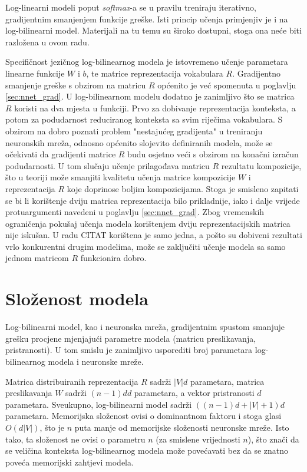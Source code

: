 \documentclass[times, utf8, diplomski, numeric]{fer}
\begin{document}
Log-linearni modeli poput \textit{softmax}-a se u pravilu treniraju iterativno, gradijentnim smanjenjem funkcije greške. Isti princip učenja primjenjiv je i na log-bilinearni model. Materijali na tu temu su široko dostupni, stoga ona neće biti razložena u ovom radu.

Specifičnost jezičnog log-bilinearnog modela je istovremeno učenje parametara linearne funkcije $W$ i $b$, te matrice reprezentacija vokabulara $R$. Gradijentno smanjenje greške s obzirom na matricu $R$ općenito je već spomenuta u poglavlju \ref{sec:nnet_grad}. U log-bilinearnom modelu dodatno je zanimljivo što se matrica $R$ koristi na dva mjesta u funkciji. Prvo za dobivanje reprezentacija konteksta, a potom za podudarnost reduciranog konteksta sa svim riječima vokabulara. S obzirom na dobro poznati problem "nestajućeg gradijenta" u treniranju neuronskih mreža, odnosno općenito slojevito definiranih modela, može se očekivati da gradijenti matrice $R$ budu osjetno veći s obzirom na konačni izračun podudarnosti. U tom slučaju učenje prilagođava matricu $R$ rezultatu kompozicije, što u teoriji može smanjiti kvalitetu učenja matrice kompozicije $W$ i reprezentacija $R$ koje doprinose boljim kompozicijama. Stoga je smisleno zapitati se bi li korištenje dviju matrica reprezentacija bilo prikladnije, iako i dalje vrijede protuargumenti navedeni u poglavlju \ref{sec:nnet_grad}. Zbog vremenskih ograničenja pokušaj učenja modela korištenjem dviju reprezentacijskih matrica nije iskušan. U radu CITAT korištena je samo jedna, a pošto su dobiveni rezultati  vrlo konkurentni drugim modelima, može se zaključiti učenje modela sa samo jednom matricom $R$ funkcionira dobro.

\section{Složenost modela}

Log-bilinearni model, kao i neuronska mreža, gradijentnim spustom smanjuje grešku procjene mjenjajući parametre modela (matricu preslikavanja, pristranosti). U tom smislu je zanimljivo usporediti broj parametara log-bilinearnog modela i neuronske mreže.

Matrica distribuiranih reprezentacija $R$ sadrži $|V| d$ parametara, matrica preslikavanja $W$ sadrži $(n - 1) d d$ parametara, a vektor pristranosti $d$ parametara. Sveukupno, log-bilinearni model sadrži $\left((n - 1) d + |V| + 1\right) d$ parametara. Memorijska složenost ovisi o dominantnom faktoru i stoga glasi $O(d |V|)$, što je $n$ puta manje od memorijske složenosti neuronske mreže. Isto tako, ta složenost ne ovisi o parametru $n$ (za smislene vrijednosti $n$), što znači da se veličina konteksta log-bilinearnog modela može povećavati bez da se znatno poveća memorijski zahtjevi modela.
\end{document}
